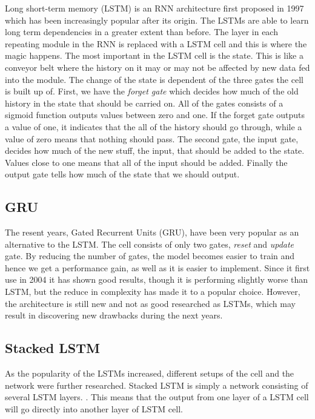\documentclass{article} %
\begin{document}
Long short-term memory (LSTM) is an RNN architecture first proposed in 1997 \cite{LSTM} which has been increasingly popular after its origin. The LSTMs are able to learn long term dependencies in a greater extent than before. The layer in each repeating module in the RNN is replaced with a LSTM cell and this is where the magic happens. The most important in the LSTM cell is the state. This is like a conveyor belt where the history on it may or may not be affected by new data fed into the module. The change of the state is dependent of the three gates the cell is built up of. First, we have the \textit{forget gate} which decides how much of the old history in the state that should be carried on. All of the gates consists of a sigmoid function outputs values between zero and one. If the forget gate outputs a value of one, it indicates that the all of the history should go through, while a value of zero means that nothing should pass. The second gate, the input gate, decides how much of the new stuff, the input, that should be added to the state. Values close to one means that all of the input should be added. Finally the output gate tells how much of the state that we should output.

\subsection{GRU}
The resent years, Gated Recurrent Units (GRU), have been very popular as an alternative to the LSTM. The cell consists of only two gates, \textit{reset} and \textit{update} gate. By reducing the number of gates, the model becomes easier to train and hence we get a performance gain, as well as it is easier to implement. Since it first use in 2004 \cite{Cho} it has shown good results, though it is performing slightly worse than LSTM, but the reduce in complexity has made it to a popular choice. However, the architecture is still new and not as good researched as LSTMs, which may result in discovering new drawbacks during the next years.

\subsection{Stacked LSTM}
As the popularity of the LSTMs increased, different setups of the cell and the network were further researched. Stacked LSTM is simply a network consisting of several LSTM layers. \cite{Kalchbrenner}. This means that the output from one layer of a LSTM cell will go directly into another layer of LSTM cell.
\end{document}
